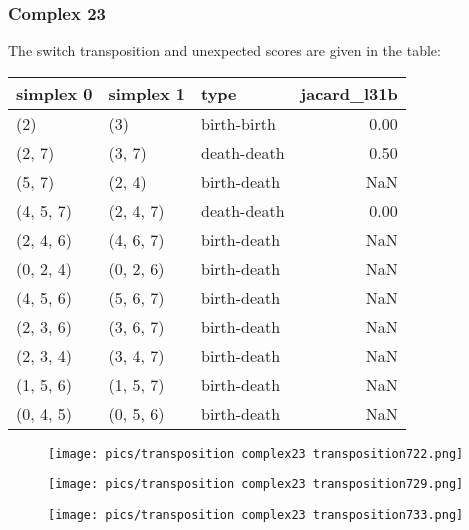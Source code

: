 \documentclass{article}
\begin{document}
    \subsubsection{Complex 23}
    \par The switch transposition and unexpected scores are given in the table:
    \begin{center}
\begin{tabular}{lllr}
\toprule
simplex 0 & simplex 1 & type & jacard\_l31b \\
\midrule
(2) & (3) & birth-birth & 0.00 \\
(2, 7) & (3, 7) & death-death & 0.50 \\
(5, 7) & (2, 4) & birth-death & NaN \\
(4, 5, 7) & (2, 4, 7) & death-death & 0.00 \\
(2, 4, 6) & (4, 6, 7) & birth-death & NaN \\
(0, 2, 4) & (0, 2, 6) & birth-death & NaN \\
(4, 5, 6) & (5, 6, 7) & birth-death & NaN \\
(2, 3, 6) & (3, 6, 7) & birth-death & NaN \\
(2, 3, 4) & (3, 4, 7) & birth-death & NaN \\
(1, 5, 6) & (1, 5, 7) & birth-death & NaN \\
(0, 4, 5) & (0, 5, 6) & birth-death & NaN \\
\bottomrule
\end{tabular}
\end{center}
    
        \begin{figure}[ht]
        \centering
        \texttt{[image: pics/transposition complex23 transposition722.png]}
        \end{figure}
    

        \begin{figure}[ht]
        \centering
        \texttt{[image: pics/transposition complex23 transposition729.png]}
        \end{figure}
    

        \begin{figure}[ht]
        \centering
        \texttt{[image: pics/transposition complex23 transposition733.png]}
        \end{figure}
    
    
\end{document}
